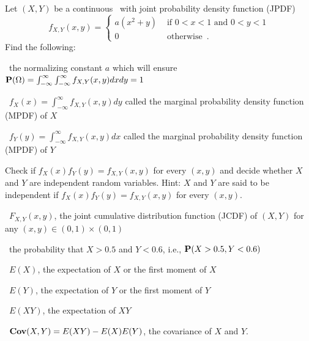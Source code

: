 \begin{ExerciseList}
\Exercise
Let $(X,Y)$ be a continuous \rv~with joint probability density function (JPDF)
\[
f_{X,Y}(x,y)
=
\begin{cases}
a (x^2+y) & \text{ if } 0 < x < 1 \text{ and } 0 < y < 1\\
0 & \text{ otherwise} \enspace .
\end{cases}
\]
Find the following:
\be
\item~the normalizing constant $a$ which will ensure $\mathbf{P}(\Omega) = \int_{-\infty}^{\infty}\int_{-\infty}^{\infty} f_{X,Y}(x,y) dx dy = 1$
\item~$f_X(x) = \int_{-\infty}^{\infty} f_{X,Y}(x,y) dy$ called the marginal probability density function (MPDF) of $X$
\item~$f_Y(y) = \int_{-\infty}^{\infty} f_{X,Y}(x,y) dx$ called the marginal probability density function (MPDF) of $Y$
\item Check if $f_X(x)f_Y(y)=f_{X,Y}(x,y)$ for every $(x,y)$ and decide whether $X$ and $Y$ are independent random variables.  {Hint: $X$ and $Y$ are said to be independent if $f_X(x)f_Y(y)=f_{X,Y}(x,y)$ for every $(x,y)$.}
\item~$F_{X,Y}(x,y)$, the joint cumulative distribution function (JCDF) of $(X,Y)$ for any $(x,y) \in (0,1) \times (0,1)$ 
\item~the probability that $X > 0.5$ and $Y<0.6$, i.e., $\mathbf{P}(X>0.5,Y<0.6)$
\item~$E(X)$, the expectation of $X$ or the first moment of $X$
\item~$E(Y)$, the expectation of $Y$ or the first moment of $Y$
\item~$E(XY)$, the expectation of $XY$
\item~$\mathbf{Cov}(X,Y)=E(XY)-E(X)E(Y)$, the covariance of $X$ and $Y$.
\ee


\end{ExerciseList}
